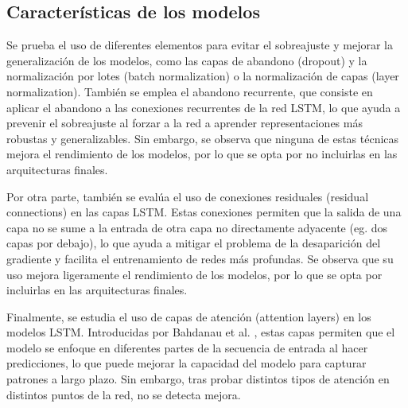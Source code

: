 \subsection{Características de los modelos}
Se prueba el uso de diferentes elementos para evitar el sobreajuste y mejorar la generalización de los modelos, como las capas de abandono (dropout) y la normalización 
por lotes (batch normalization) o la normalización de capas (layer normalization). También se emplea el abandono recurrente, que consiste en aplicar el abandono a las conexiones recurrentes de la red LSTM, lo que ayuda a prevenir el sobreajuste al forzar a la red a aprender representaciones más robustas y generalizables.
Sin embargo, se observa que ninguna de estas técnicas mejora el rendimiento de los modelos, por lo que se opta por no incluirlas en las arquitecturas finales.

Por otra parte, también se evalúa el uso de conexiones residuales (residual connections) en las capas LSTM. Estas conexiones permiten que la salida de una capa no se sume a la
 entrada de otra capa no directamente adyacente (eg. dos capas por debajo), lo que ayuda a mitigar el problema de la desaparición del gradiente y facilita el entrenamiento de redes más profundas.
Se observa que su uso mejora ligeramente el rendimiento de los modelos, por lo que se opta por incluirlas en las arquitecturas finales.

Finalmente, se estudia el uso de capas de atención (attention layers) en los modelos LSTM. Introducidas por Bahdanau et al. \cite{bahdanau2014}, estas capas permiten que el modelo se enfoque en diferentes partes de la secuencia de entrada al hacer predicciones, lo que puede mejorar la capacidad del modelo para capturar patrones a largo plazo.
Sin embargo, tras probar distintos tipos de atención en distintos puntos de la red, no se detecta mejora.


